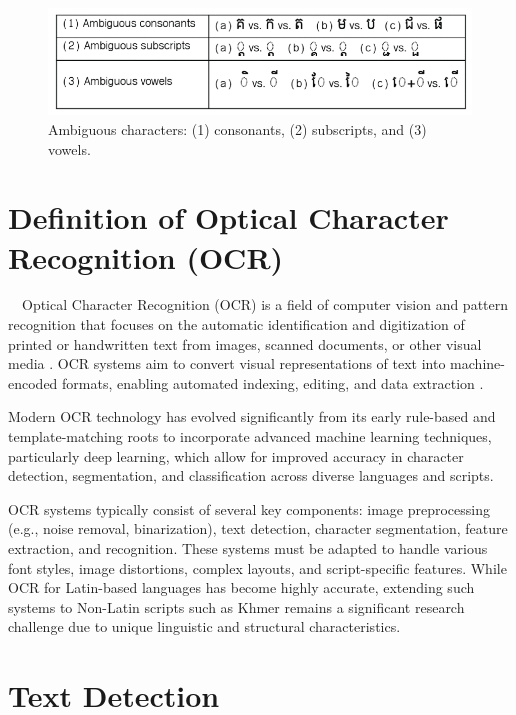 \begin{figure}[H]
  \centering
  \includegraphics[width=\textwidth]{figures/Ambiguous_characters.png}
  \caption{Ambiguous characters: (1) consonants, (2) subscripts, and (3) vowels. \citet{buoy2023khmerocr}}
  \label{fig:Ambiguous_characters}
\end{figure}

\section{Definition of Optical Character Recognition (OCR)}
\label{sec:ocr-definition}
​ ​ ​ ​ Optical Character Recognition (OCR) is a field of computer vision and pattern recognition
 that focuses on the automatic identification and digitization of printed or handwritten 
 text from images, scanned documents, or other visual media \citep{singh2012survey}. 
 OCR systems aim to convert visual representations of text into machine-encoded formats, 
 enabling automated indexing, editing, and data extraction \citep{muaz2015khmerocr}.

Modern OCR technology has evolved significantly from its early rule-based and 
template-matching
roots to incorporate advanced machine learning techniques, particularly deep learning,
which allow for improved accuracy in character detection, segmentation, 
and classification across 
diverse languages and scripts.

OCR systems typically consist of several key components: 
image preprocessing (e.g., noise removal, binarization), 
text detection, character segmentation, feature extraction, 
and recognition. These systems must be adapted to handle various 
font styles, image distortions, complex layouts, and script-specific 
features. While OCR for Latin-based languages has become highly accurate, 
extending such systems to Non-Latin scripts such as Khmer remains a 
significant research challenge due to unique linguistic and structural characteristics.
  

\section{Text Detection}
\label{sec:text_detection_literature}

